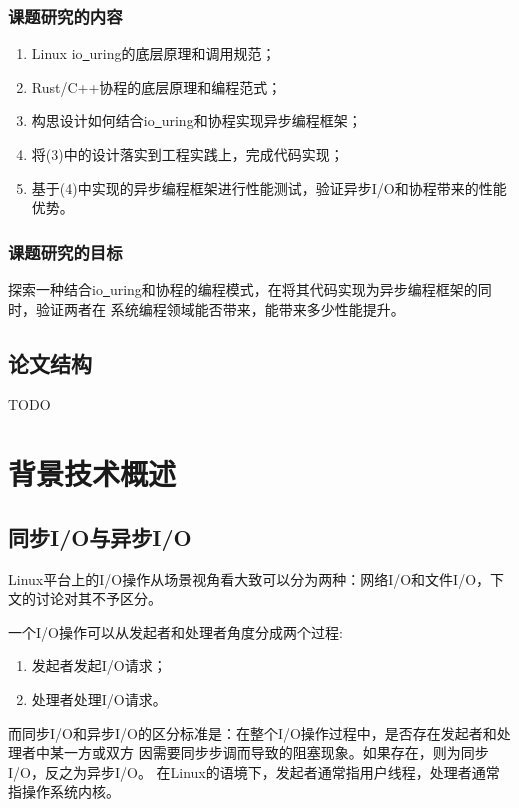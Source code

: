 \documentclass[supercite]{HustGraduPaper}
\theoremstyle{definition}
\begin{document}
\subsubsection{课题研究的内容}
\begin{enumerate}
  \item Linux io\underline{~}uring的底层原理和调用规范；
  \item Rust/C++协程的底层原理和编程范式；
  \item 构思设计如何结合io\underline{~}uring和协程实现异步编程框架；
  \item 将(3)中的设计落实到工程实践上，完成代码实现；
  \item 基于(4)中实现的异步编程框架进行性能测试，验证异步I/O和协程带来的性能优势。
\end{enumerate}

\subsubsection{课题研究的目标}
探索一种结合io\underline{~}uring和协程的编程模式，在将其代码实现为异步编程框架的同时，验证两者在
系统编程领域能否带来，能带来多少性能提升。\par

\subsection{论文结构}
TODO

\section{背景技术概述}
\subsection{同步I/O与异步I/O}
Linux平台上的I/O操作从场景视角看大致可以分为两种：网络I/O和文件I/O，下文的讨论对其不予区分。\par

一个I/O操作可以从发起者和处理者角度分成两个过程:
\begin{enumerate}
    \item 发起者发起I/O请求；
    \item 处理者处理I/O请求。
\end{enumerate}\par
而同步I/O和异步I/O的区分标准是：在整个I/O操作过程中，是否存在发起者和处理者中某一方或双方
因需要同步步调而导致的阻塞现象。如果存在，则为同步I/O，反之为异步I/O。
在Linux的语境下，发起者通常指用户线程，处理者通常指操作系统内核。\par
\end{document}
